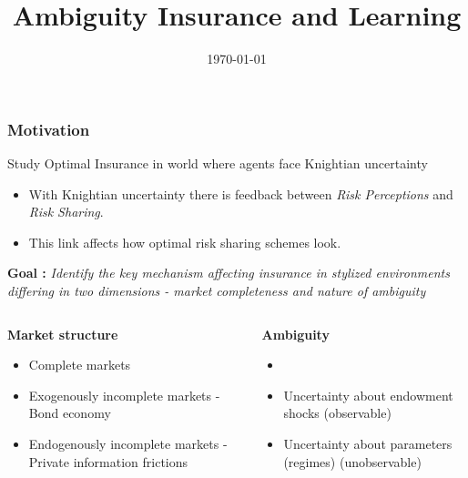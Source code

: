 \documentclass{beamer}
\title{Ambiguity Insurance and Learning}
\date{\today}
\theoremstyle{definition}
\begin{document}
%
\begin{frame}
\titlepage
\end{frame}

\begin{frame}
\frametitle{Motivation}
Study Optimal Insurance in world where agents face Knightian uncertainty 

\begin{itemize}
	\item With Knightian uncertainty there is feedback between \emph{Risk Perceptions} and \emph{Risk Sharing}.
	\item This link affects how optimal risk sharing schemes look.
\end{itemize}
\end{frame}




\begin{frame}
\textbf{Goal :} \emph{Identify the key mechanism affecting insurance in \emph{stylized} environments differing in two dimensions - market completeness and nature of ambiguity}
\vspace{4mm}
\begin{columns}
  \begin{column}{0.5\textwidth}
  \textbf{Market structure}
    \begin{itemize}
\item \small Complete markets 
	\item  \small Exogenously incomplete markets - Bond economy
	\item \small  Endogenously incomplete markets - Private information frictions
   \end{itemize}
  \end{column}
  \begin{column}{0.5\textwidth}
  \textbf{Ambiguity}
     \begin{itemize}
     \item[]
\item \small  Uncertainty about endowment shocks  (observable)
\item \small  Uncertainty about parameters (regimes) (unobservable)
     \end{itemize}
  \end{column}
\end{columns}

\end{frame}
\end{document}
